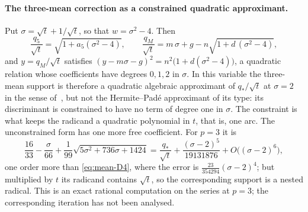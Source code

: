 \paragraph{The three-mean correction as a constrained quadratic approximant.}
Put $\sigma=\sqrt t+1/\sqrt t$, so that $w=\sigma^{2}-4$. Then
\[ \frac{q_5}{\sqrt t}=\sqrt{1+a_5(\sigma^{2}-4)},\qquad
\frac{q_M}{\sqrt t}=m\,\sigma+g-n\sqrt{1+d\,(\sigma^{2}-4)} , \]
and $y=q_M/\sqrt t$ satisfies $(y-m\sigma-g)^{2}=n^{2}\bigl(1+d(\sigma^{2}-4)\bigr)$, a quadratic
relation whose coefficients have degrees $0,1,2$ in $\sigma$. In this variable the three-mean support
is therefore a quadratic algebraic approximant of $q_*/\sqrt t$ at $\sigma=2$ in the sense
of~\cite{shafer}, but not the Hermite--Pad\'e approximant of its type: its discriminant is constrained to
have no term of degree one in $\sigma$. The constraint is what keeps the radicand a quadratic
polynomial in $t$, that is, one arc. The unconstrained form has one more free coefficient. For $p=3$
it is
\[ \frac{16}{33}-\frac{\sigma}{66}+\frac1{99}\sqrt{5\sigma^{2}+736\sigma+1424}
=\frac{q_*}{\sqrt t}+\frac{(\sigma-2)^{5}}{19131876}+O\bigl((\sigma-2)^{6}\bigr), \]
one order more than \eqref{eq:mean-D4}, where the error is $\tfrac{23}{354294}(\sigma-2)^{4}$; but
multiplied by $t$ its radicand contains $\sqrt t$, so the corresponding support is a nested radical.
This is an exact rational computation on the series at $p=3$; the corresponding iteration has not been
analysed.

